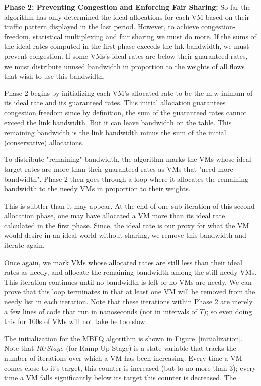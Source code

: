 {\bf Phase 2:  Preventing Congestion and Enforcing Fair Sharing:}  So far the
algorithm has only determined the ideal allocations for each VM based on their
traffic pattern displayed in the last period.   However, to achieve
congestion-freedom, statistical multiplexing and fair sharing we must do more.
If the sums of the ideal rates computed in the first phase exceeds the lnk
bandwidth, we must prevent congestion.  If some VMs's ideal rates are below
their guaranteed rates, we must distribute unused bandwidth in proportion to the
weights of all flows that wish to use this bandwidth.  

Phase 2 begins by initializing each VM's allocated rate to be the m:w
inimum of its
ideal rate and its guaranteed rates.  This initial allocation guarantees
congestion freedom since by definition, the sum of the guaranteed rates cannot
exceed the link bandwidth.  But it can leave bandwidth on the table. This
remaining bandwidth is the link bandwidth minus the sum of the initial
(conservative) allocations.

To distribute "remaining" bandwidth, the algorithm marks the VMs whose ideal
target rates are more than their guaranteed rates as VMs that "need more
bandwidth".  Phase 2 then goes through a loop where it allocates the remaining
bandwidth to the needy VMs in proportion to their weights.  

This is subtler than it may appear.   At the end of one sub-iteration of this
second allocation phase, one may have allocated a VM more than its ideal rate
calculated in the first phase.  Since, the ideal rate is our proxy for what the
VM would desire in an ideal world without sharing, we remove this bandwidth and
iterate again.  

Once again, we mark VMs whose allocated rates are still less than their ideal
rates as needy, and allocate the remaining bandwidth among the still needy VMs.
This iteration continues until no bandwidth is left or no VMs are needy.   We
can prove that this loop terminates in that at least one VM will be removed from
the needy list in each iteration.  Note that these iterations within Phase 2 are
merely a few lines of code that run in nanoseconds (not in intervals of $T$); so
even doing this for 100s of VMs will not take be too slow.

The initialization for the MBFQ algorithm is shown in
Figure~\ref{initialization}.  Note that $RUStage$ (for Ramp Up Stage) is a state
variable that tracks the number of iterations over which a VM has been
increasing.  Every time a VM comes close to it's target, this counter is
increased (but to no more than $3$); every time a VM falls significantly below
its target this counter is decreased.  The 

